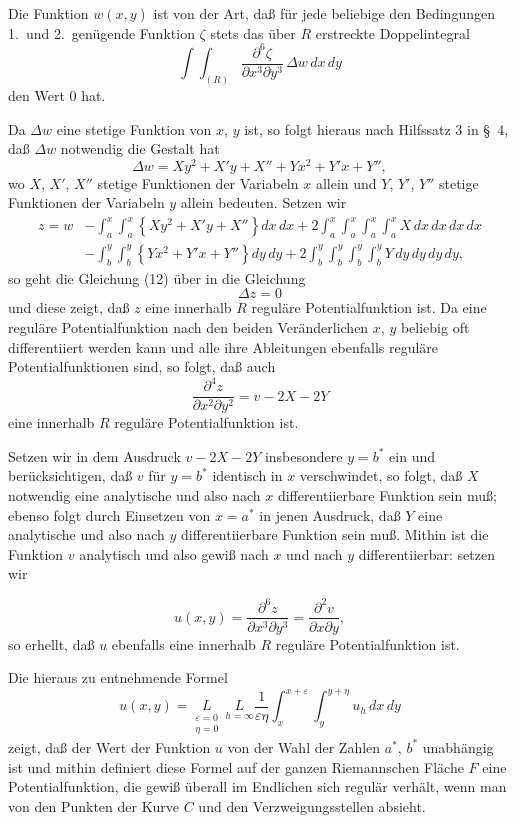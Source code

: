 \documentclass{article}
\begin{document}
Die Funktion $w(x, y)$ ist von der Art, daß für jede beliebige den Bedingungen 1.\ und 2.\ genügende Funktion $\zeta$ stets das über $R$ erstreckte Doppelintegral
\[
\int\!\!\int_{(R)} \frac{\partial^6\zeta}{\partial x^3 \partial y^3}\,\Delta w\,dx\,dy
\]
den Wert 0 hat.

Da $\Delta w$ eine stetige Funktion von $x$, $y$ ist, so folgt hieraus nach Hilfssatz 3 in §~4, daß $\Delta w$ notwendig die Gestalt hat
\[
\Delta w = Xy^2 + X'y + X'' + Yx^2 + Y'x + Y'', \tag{12}
\]
wo $X$, $X'$, $X''$ stetige Funktionen der Variabeln $x$ allein und $Y$, $Y'$, $Y''$ stetige Funktionen der Variabeln $y$ allein bedeuten. Setzen wir
\[
\begin{aligned}
z = w &- \int_a^x \int_a^x \left\{ Xy^2 + X'y + X'' \right\} dx\,dx + 2 \int_a^x \int_a^x \int_a^x \int_a^x X\,dx\,dx\,dx\,dx \\
&- \int_b^y \int_b^y \left\{ Yx^2 + Y'x + Y'' \right\} dy\,dy + 2 \int_b^y \int_b^y \int_b^y \int_b^y Y\,dy\,dy\,dy\,dy,
\end{aligned}
\]
so geht die Gleichung (12) über in die Gleichung
\[
\Delta z = 0
\]
und diese zeigt, daß $z$ eine innerhalb $R$ reguläre Potentialfunktion ist. Da eine reguläre Potentialfunktion nach den beiden Veränderlichen $x$, $y$ beliebig oft differentiiert werden kann und alle ihre Ableitungen ebenfalls reguläre Potentialfunktionen sind, so folgt, daß auch
\[
\frac{\partial^4 z}{\partial x^2 \partial y^2} = v - 2X - 2Y
\]
eine innerhalb $R$ reguläre Potentialfunktion ist.

Setzen wir in dem Ausdruck $v - 2X - 2Y$ insbesondere $y = b^*$ ein und berücksichtigen, daß $v$ für $y = b^*$ identisch in $x$ verschwindet, so folgt, daß $X$ notwendig eine analytische und also nach $x$ differentiierbare Funktion sein muß; ebenso folgt durch Einsetzen von $x = a^*$ in jenen Ausdruck, daß $Y$ eine analytische und also nach $y$ differentiierbare Funktion sein muß. Mithin ist die Funktion $v$ analytisch und also gewiß nach $x$ und nach $y$ differentiierbar: setzen wir

\[
u(x, y) = \frac{\partial^6 z}{\partial x^3 \partial y^3} = \frac{\partial^2 v}{\partial x \partial y},
\]
so erhellt, daß $u$ ebenfalls eine innerhalb $R$ reguläre Potentialfunktion ist.

Die hieraus zu entnehmende Formel
\[
u(x, y) = \underset{\substack{\varepsilon=0 \\ \eta=0}}{L} \ \underset{h=\infty}{L} \frac{1}{\varepsilon\eta} \int_x^{x+\varepsilon} \int_y^{y+\eta} u_h\,dx\,dy
\]
zeigt, daß der Wert der Funktion $u$ von der Wahl der Zahlen $a^*$, $b^*$ unabhängig ist und mithin definiert diese Formel auf der ganzen Riemannschen Fläche $F$ eine Potentialfunktion, die gewiß überall im Endlichen sich regulär verhält, wenn man von den Punkten der Kurve $C$ und den Verzweigungsstellen absieht.
\end{document}
